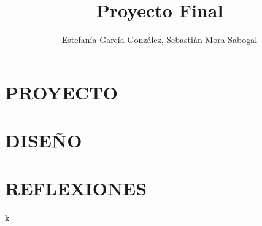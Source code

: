 \documentclass[11pt,letterpaper]{book}
\title{Proyecto Final}
\author{Estefanía García González, Sebastián Mora Sabogal}
\begin{document}
\maketitle
\tableofcontents
\listoffigures

\part{PROYECTO}


\part{DISEÑO}








\part{REFLEXIONES}
k


\end{document}
